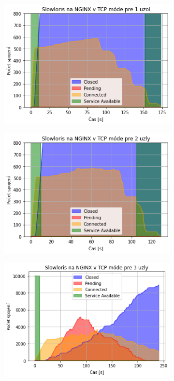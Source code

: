 \documentclass[12pt, a4paper]{article}
\begin{document}
\begin{figure}[h!]
\begin{subfigure}[t]{.32\textwidth}
	\end{subfigure}
	\begin{subfigure}[t]{.32\textwidth}
  		\centering
  		\includegraphics[width=\textwidth]{images/nginx-1-tcp.png}
	\end{subfigure}
	\begin{subfigure}[t]{.32\textwidth}
  		\centering
  		\includegraphics[width=\textwidth]{images/nginx-2-tcp.png}
	\end{subfigure}
	\begin{subfigure}[t]{.32\textwidth}
  		\centering
  		\includegraphics[width=\textwidth]{images/nginx-3-tcp.png}

\end{subfigure}
\end{figure}
\end{document}
